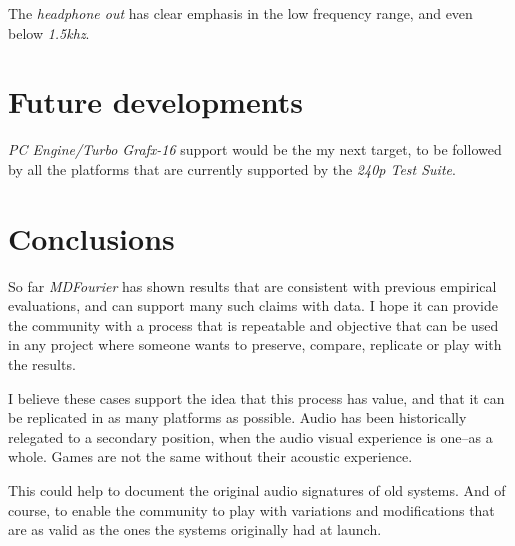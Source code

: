 \documentclass[10pt,a4paper]{report}
\newcommand{\khz}[1]{\textit{#1\acrshort{khz}}}
\begin{document}
The \textit{headphone out} has clear emphasis in the low frequency range, and even below \khz{1.5}.

\chapter{Future developments}

\textit{PC Engine/Turbo Grafx-16} support would be the my next target, to be followed by all the platforms that are currently supported by the \textit{240p Test Suite}.

\chapter{Conclusions}

So far \textit{MDFourier} has shown results that are consistent with previous empirical evaluations, and can support many such claims with data. I hope it can provide the community with a process that is repeatable and objective that can be used in any project where someone wants to preserve, compare, replicate or play with the results.

I believe these cases support the idea that this process has value, and that it can be replicated in as many platforms as possible. Audio has been historically relegated to a secondary position, when the audio visual experience is one--as a whole. Games are not the same without their acoustic experience.

This could help to document the original audio signatures of old systems. And of course, to enable the community to play with variations and modifications that are as valid as the ones the systems originally had at launch.
\end{document}
